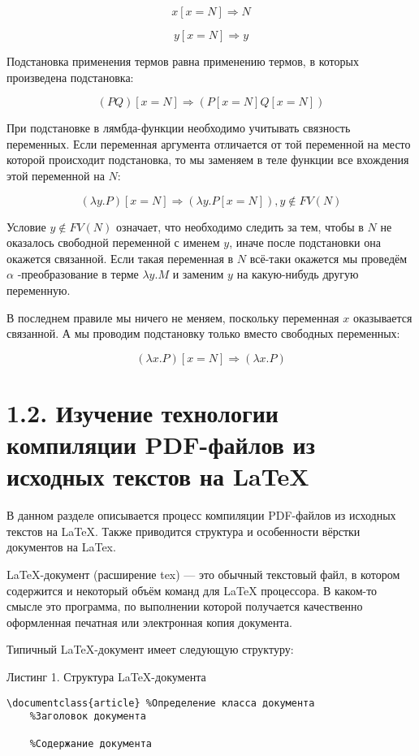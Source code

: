 $$ x[x=N] \Rightarrow N $$

$$ y[x=N] \Rightarrow y $$

Подстановка применения термов равна применению термов, в которых произведена подстановка:

$$ (PQ)[x=N] \Rightarrow (P[x=N] Q[x=N]) $$

При подстановке в лямбда-функции необходимо учитывать связность переменных. Если переменная аргумента отличается от той переменной на место которой происходит подстановка, то мы заменяем в теле функции все вхождения этой переменной на $ N $:

$$ (\lambda y.P)[x=N] \Rightarrow (\lambda y. P[x=N]), y \notin FV(N) $$

Условие $ y \notin FV(N) $ означает, что необходимо следить за тем, чтобы в $ N $ не оказалось свободной переменной с именем $ y $, иначе после подстановки она окажется связанной. Если такая переменная в $ N $ всё-таки окажется мы проведём $ \alpha $ -преобразование в терме $ \lambda y. M $ и заменим $ y $ на какую-нибудь другую переменную.

В последнем правиле мы ничего не меняем, поскольку переменная $ x $ оказывается связанной. А мы проводим подстановку только вместо свободных переменных:

$$ (\lambda x.P)[x=N] \Rightarrow (\lambda x.P) $$ \cite{barry_jay}

\section{1.2. Изучение технологии компиляции PDF-файлов из исходных текстов на LaTeX}


В данном разделе описывается процесс компиляции PDF-файлов из исходных текстов на LaTeX. Также приводится структура и особенности вёрстки документов на LaTex.


LaTeX-документ (расширение tex) — это обычный текстовый файл, в котором содержится и некоторый объём команд для LaTeX процессора. В каком-то смысле это программа, по выполнении которой получается качественно оформленная печатная или электронная копия документа. \cite{ibm_latex}

Типичный LaTeX-документ имеет следующую структуру:

Листинг 1. Структура LaTeX-документа
\begin{verbatim}
\documentclass{article} %Определение класса документа
    %Заголовок документа

    %Содержание документа

\end{verbatim}

